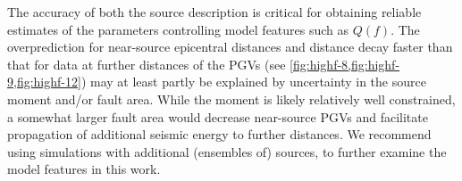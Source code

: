 

The accuracy of both the source description is critical for obtaining reliable estimates of the parameters controlling model features such as $Q(f)$. The overprediction for near-source epicentral distances and distance decay faster than that for data at further distances of the PGVs (see \cref{fig:highf-8,fig:highf-9,fig:highf-12}) may at least partly be explained by uncertainty in the source moment and/or fault area. While the moment is likely relatively well constrained, a somewhat larger fault area  would decrease near-source PGVs and facilitate propagation of additional seismic energy to further distances. We recommend using simulations with additional (ensembles of) sources, to further examine the model features in this work.


